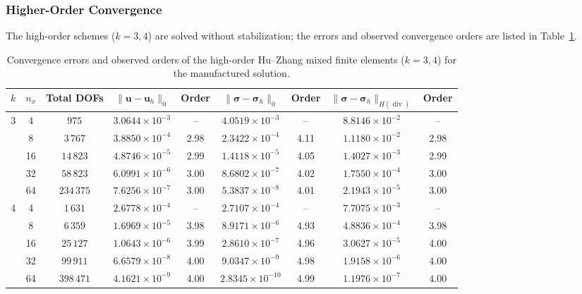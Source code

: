\subsubsection{Higher-Order Convergence}

The high-order schemes ($k=3,4$) are solved without stabilization; the errors and observed convergence orders are listed in Table~\ref{tab:convergence_high_order}.

\begin{table}[t]
\centering
\caption{Convergence errors and observed orders of the high-order Hu--Zhang mixed finite elements ($k=3,4$) for the manufactured solution.}
\label{tab:convergence_high_order}
\small
\setlength{\tabcolsep}{4pt}
\begin{tabular}{ccccccccc}
\toprule
$k$ & $n_x$ & Total DOFs & $\|\boldsymbol{u}-\boldsymbol{u}_h\|_0$ & Order & $\|\boldsymbol{\sigma}-\boldsymbol{\sigma}_h\|_0$ & Order & $\|\boldsymbol{\sigma}-\boldsymbol{\sigma}_h\|_{H(\operatorname{div})}$ & Order \\
\midrule
3 & 4  & $975$     & $3.0644\times10^{-3}$ & --   & $4.0519\times10^{-3}$  & --   & $8.8146\times10^{-2}$ & --   \\
  & 8  & $3\,767$   & $3.8850\times10^{-4}$ & 2.98 & $2.3422\times10^{-4}$  & 4.11 & $1.1180\times10^{-2}$ & 2.98 \\
  & 16 & $14\,823$  & $4.8746\times10^{-5}$ & 2.99 & $1.4118\times10^{-5}$  & 4.05 & $1.4027\times10^{-3}$ & 2.99 \\
  & 32 & $58\,823$  & $6.0991\times10^{-6}$ & 3.00 & $8.6802\times10^{-7}$  & 4.02 & $1.7550\times10^{-4}$ & 3.00 \\
  & 64 & $234\,375$ & $7.6256\times10^{-7}$ & 3.00 & $5.3837\times10^{-8}$  & 4.01 & $2.1943\times10^{-5}$ & 3.00 \\
\midrule
4 & 4  & $1\,631$   & $2.6778\times10^{-4}$ & --   & $2.7107\times10^{-4}$  & --   & $7.7075\times10^{-3}$ & --   \\
  & 8  & $6\,359$   & $1.6969\times10^{-5}$ & 3.98 & $8.9171\times10^{-6}$  & 4.93 & $4.8836\times10^{-4}$ & 3.98 \\
  & 16 & $25\,127$  & $1.0643\times10^{-6}$ & 3.99 & $2.8610\times10^{-7}$  & 4.96 & $3.0627\times10^{-5}$ & 4.00 \\
  & 32 & $99\,911$  & $6.6579\times10^{-8}$ & 4.00 & $9.0347\times10^{-9}$  & 4.98 & $1.9158\times10^{-6}$ & 4.00 \\
  & 64 & $398\,471$ & $4.1621\times10^{-9}$ & 4.00 & $2.8345\times10^{-10}$ & 4.99 & $1.1976\times10^{-7}$ & 4.00 \\
\bottomrule
\end{tabular}
\end{table}

